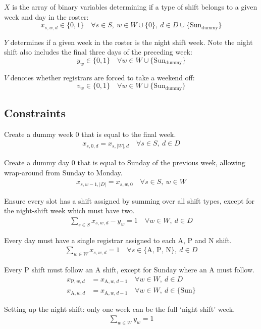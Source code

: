 \documentclass[a4paper]{article}
\begin{document}
$X$ is the array of binary variables determining if a type of shift belongs to a given week and day in the roster:
$$x_{s, w, d} \in \{0, 1\} \quad\forall s\in S,\  w\in W \cup \{0\},\  d\in D \cup \{\text{Sun}_\text{dummy}\}$$

$Y$ determines if a given week in the roster is the night shift week. Note the night shift also includes the final three days of the preceding week:
$$y_w \in \{0, 1\} \quad\forall w\in W \cup \{\text{Sun}_\text{dummy}\}$$

$V$ denotes whether registrars are forced to take a weekend off:
$$v_w \in \{0, 1\} \quad\forall w\in W \cup \{\text{Sun}_\text{dummy}\}$$

\subsection{Constraints}

Create a dummy week 0 that is equal to the final week.
\begin{align}
  x_{s, 0, d} = x_{s, |W|, d} \quad\forall s\in S,\ d\in D
\end{align}

Create a dummy day 0 that is equal to Sunday of the previous week, allowing wrap-around from Sunday to Monday.
\begin{align}
  x_{s, w-1, |D|} = x_{s, w, 0} \quad\forall s\in S,\ w\in W
\end{align}

Ensure every slot has a shift assigned by summing over all shift types, except for the night-shift week which must have two.
\begin{align}
  \sum_{s\in S} x_{s, w, d} - y_w = 1 \quad\forall w\in W,\ d\in D
\end{align}

Every day must have a single registrar assigned to each A, P and N shift.
\begin{align}
  \sum_{w\in W} x_{s, w, d} = 1 \quad\forall s\in \{\text{A, P, N}\},\ d\in D
\end{align}

Every P shift must follow an A shift, except for Sunday where an A must follow.
\begin{align}
  x_{\text{P}, w, d} &= x_{\text{A}, w, d-1} \quad\forall w\in W,\ d\in D\\
  x_{\text{A}, w, d} &= x_{\text{A}, w, d-1} \quad\forall w\in W,\ d\in \{\text{Sun}\}
\end{align}

Setting up the night shift: only one week can be the full `night shift' week.
\begin{align}
  \sum_{w\in W} y_w = 1
\end{align}
\end{document}
